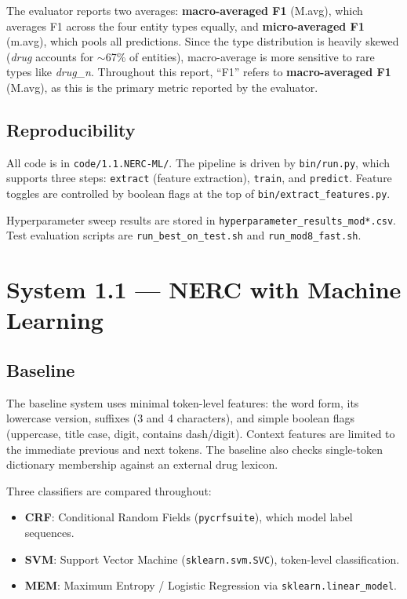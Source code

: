 \documentclass[a4paper,12pt]{article}
\begin{document}
The evaluator reports two averages: \textbf{macro-averaged F1} (M.avg), which averages F1 across the four entity types equally, and \textbf{micro-averaged F1} (m.avg), which pools all predictions. Since the type distribution is heavily skewed (\textit{drug} accounts for $\sim$67\% of entities), macro-average is more sensitive to rare types like \textit{drug\_n}. Throughout this report, ``F1'' refers to \textbf{macro-averaged F1} (M.avg), as this is the primary metric reported by the evaluator.

\subsection{Reproducibility}
All code is in \texttt{code/1.1.NERC-ML/}. The pipeline is driven by \texttt{bin/run.py}, which supports three steps: \texttt{extract} (feature extraction), \texttt{train}, and \texttt{predict}. Feature toggles are controlled by boolean flags at the top of \texttt{bin/extract\_features.py}.

Hyperparameter sweep results are stored in \texttt{hyperparameter\_results\_mod*.csv}. Test evaluation scripts are \texttt{run\_best\_on\_test.sh} and \texttt{run\_mod8\_fast.sh}.

\section{System 1.1 — NERC with Machine Learning}

\subsection{Baseline}
The baseline system uses minimal token-level features: the word form, its lowercase version, suffixes (3 and 4 characters), and simple boolean flags (uppercase, title case, digit, contains dash/digit). Context features are limited to the immediate previous and next tokens. The baseline also checks single-token dictionary membership against an external drug lexicon.

Three classifiers are compared throughout:
\begin{itemize}[nosep]
    \item \textbf{CRF}: Conditional Random Fields (\texttt{pycrfsuite}), which model label sequences.
    \item \textbf{SVM}: Support Vector Machine (\texttt{sklearn.svm.SVC}), token-level classification.
    \item \textbf{MEM}: Maximum Entropy / Logistic Regression
    via \texttt{sklearn.linear\_model}.
\end{itemize}
\end{document}
